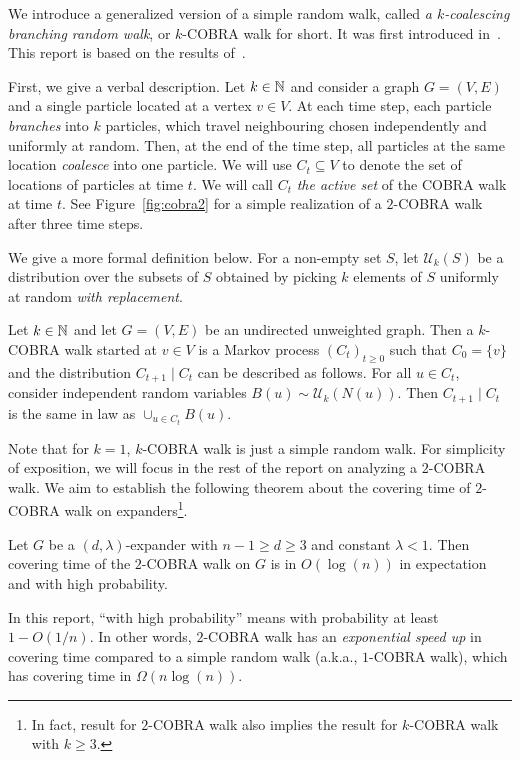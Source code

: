 \documentclass[11pt]{article}
\theoremstyle{remark}
\begin{document}
We introduce a generalized version of a simple random walk, called \emph{a $k$-coalescing branching random walk}, or $k$-COBRA walk for short. It was first introduced in~\cite{Dutta2013Cobra}. This report is based on the results of~\cite{DualCobra}.

First, we give a verbal description. Let $k\in \mathbb N$ and consider a graph $G = (V,E)$ and a single particle located at a vertex $v \in V$. At each time step, each particle \emph{branches} into $k$ particles, which travel neighbouring chosen independently and uniformly at random. Then, at the end of the time step, all particles at the same location \emph{coalesce} into one particle. We will use $C_t \subseteq V$ to denote the set of locations of particles at time $t$. We will call $C_t$ \emph{the active set} of the COBRA walk at time $t$. See Figure~\ref{fig:cobra2} for a simple realization of a $2$-COBRA walk after three time steps. 

We give a more formal definition below. For a non-empty set $S$, let $\mathcal U_k(S)$ be a distribution over the subsets of $S$ obtained by picking $k$ elements of $S$ uniformly at random \emph{with replacement}.  


\begin{definition}
\label{def:cobra}
    Let $k\in \mathbb N$ and let $G = (V,E)$ be an undirected unweighted graph. 
    Then a $k$-COBRA walk started at $v \in V$ is a Markov process $(C_t)_{t\ge0}$ such that $C_0 = \{v\}$ and the distribution $C_{t+1} \mid C_t$ can be described as follows. For all $u \in C_t$, consider independent random variables $B(u) \sim \mathcal U_k(N(u))$. Then $C_{t+1} \mid C_t$ is the same in law as $\cup_{u \in C_t} B(u)$.
\end{definition}

 Note that for $k = 1$, $k$-COBRA walk is just a simple random walk. For simplicity of exposition, we will focus in the rest of the report on analyzing a $2$-COBRA walk. We aim to establish the following theorem about the covering time of $2$-COBRA walk on expanders\footnote{In fact, result for $2$-COBRA walk also implies the result for $k$-COBRA walk with $k \ge 3$.}.
\begin{theorem}
    \label{thm:main}
    Let $G$ be a $(d,\lambda)$-expander with $n-1 \ge d \ge 3$ and constant $\lambda < 1$. Then covering time of the $2$-COBRA walk on $G$ is in $O(\log(n))$ in expectation and with high probability. 
\end{theorem}
In this report, ``with high probability'' means with probability at least $1 - O\left(1/n\right)$. In other words, $2$-COBRA walk has an \emph{exponential speed up} in covering time compared to a simple random walk (a.k.a., $1$-COBRA walk), which has covering time in $\Omega(n\log(n))$.
\end{document}

